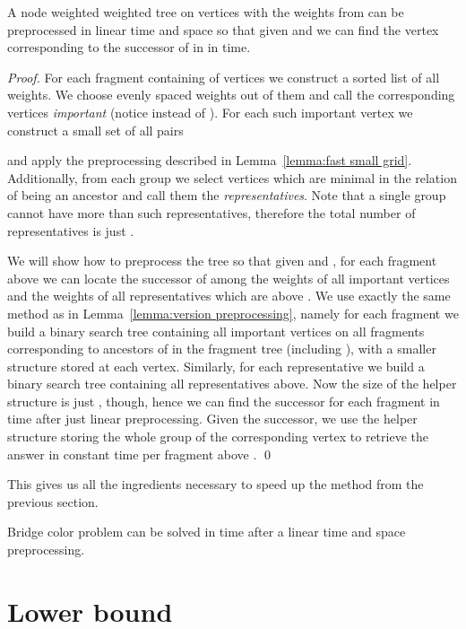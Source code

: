 \documentclass[runningheads]{llncs}
\begin{document}
\begin{lemma}\label{lemma:fast version preprocessing}
A node weighted weighted tree on  vertices with the weights from  can be preprocessed in linear time and space so that given  and  we can find the vertex corresponding to the successor of  in  in  time.
\end{lemma}

\begin{proof}
For each fragment containing of  vertices we construct a sorted list of all weights. We choose  evenly spaced weights out of them and call the corresponding vertices {\it important} (notice  instead of ). For each such important vertex  we construct a small set of all pairs

and apply the preprocessing described in Lemma~\ref{lemma:fast small grid}. Additionally, from each group we select vertices which are minimal in the relation of being an ancestor and call them the {\it representatives}. Note that a single group cannot have more than  such representatives, therefore the total number of representatives is just .

We will show how to preprocess the tree so that given  and , for each fragment above  we can locate the successor of  among the weights of all important vertices and the weights of all representatives which are above .  We use exactly the same method as in Lemma~\ref{lemma:version preprocessing}, namely for each fragment  we build a binary search tree containing all important vertices on all fragments corresponding to ancestors of  in the fragment tree (including ), with a smaller structure stored at each vertex. Similarly, for each representative we build a binary search tree containing all representatives above. Now the size of the helper structure is just , though,  hence we can find the successor for each fragment in  time after just linear preprocessing. Given the successor, we use the helper structure storing the whole group of the corresponding vertex to retrieve the answer in constant time per fragment above .
\qed
\end{proof}

This gives us all the ingredients necessary to speed up the method from the previous section.

\begin{theorem}
Bridge color problem can be solved in  time after a linear time and space preprocessing.
\end{theorem}

\section{Lower bound}
\label{section:lower bound}
\end{document}
